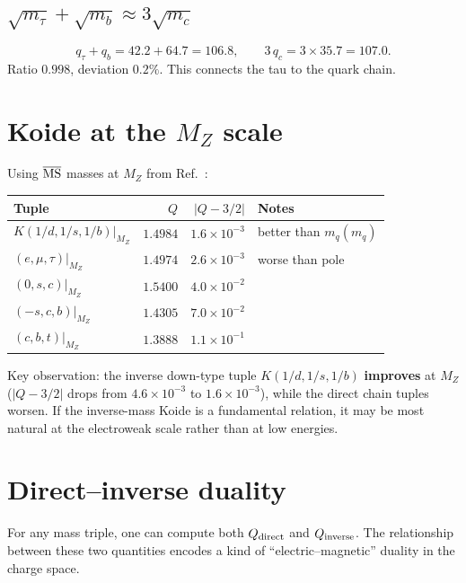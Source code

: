 \documentclass[11pt]{article}
\begin{document}
\subsection{$\sqrt{m_\tau} + \sqrt{m_b} \approx 3\sqrt{m_c}$}

\begin{equation}
  q_\tau + q_b = 42.2 + 64.7 = 106.8,
  \qquad
  3\,q_c = 3\times 35.7 = 107.0.
\end{equation}
Ratio $0.998$, deviation $0.2\%$.  This connects the tau to
the quark chain.

\section{Koide at the $M_Z$ scale}

Using $\overline{\rm MS}$ masses at $M_Z$ from
Ref.~\cite{AHS2025}:

\begin{center}\small
\begin{tabular}{@{}l r r l@{}}
\toprule
Tuple & $Q$ & $|Q-3/2|$ & Notes \\
\midrule
$K(1/d,1/s,1/b)\big|_{M_Z}$ & $1.4984$ & $1.6\times 10^{-3}$ & better than $m_q(m_q)$ \\
$(e,\mu,\tau)\big|_{M_Z}$ & $1.4974$ & $2.6\times 10^{-3}$ & worse than pole \\
$(0,s,c)\big|_{M_Z}$ & $1.5400$ & $4.0\times 10^{-2}$ & \\
$(-s,c,b)\big|_{M_Z}$ & $1.4305$ & $7.0\times 10^{-2}$ & \\
$(c,b,t)\big|_{M_Z}$ & $1.3888$ & $1.1\times 10^{-1}$ & \\
\bottomrule
\end{tabular}
\end{center}

\noindent
Key observation: the inverse down-type tuple $K(1/d,1/s,1/b)$
\textbf{improves} at $M_Z$ ($|Q-3/2|$ drops from $4.6\times
10^{-3}$ to $1.6\times 10^{-3}$), while the direct chain tuples
worsen.  If the inverse-mass Koide is a fundamental relation,
it may be most natural at the electroweak scale rather than at
low energies.

\section{Direct--inverse duality}

For any mass triple, one can compute both $Q_{\rm direct}$ and
$Q_{\rm inverse}$.  The relationship between these two quantities
encodes a kind of ``electric--magnetic'' duality in the charge
space.
\end{document}
